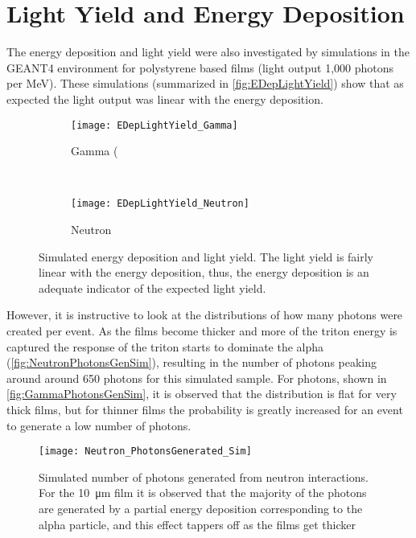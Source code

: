 \section{Light Yield and Energy Deposition}
The energy deposition and light yield were also investigated by simulations in the GEANT4 environment for polystyrene based films (light output 1,000 photons per MeV).
These simulations (summarized in \autoref{fig:EDepLightYield}) show that as expected the light output was linear with the energy deposition.
\begin{figure*}[ht]
	\centering
	\begin{subfigure}[b]{0.45\textwidth}
    		\texttt{[image: EDepLightYield\_Gamma]}
		\caption{ Gamma (}
	\end{subfigure}%
	~
	\begin{subfigure}[b]{0.45\textwidth}
    		\texttt{[image: EDepLightYield\_Neutron]}
		  \caption{ Neutron}
	\end{subfigure}%
  \caption[Energy Deposition and Light Yield]{Simulated energy deposition and light yield.  The light yield is fairly linear with the energy deposition, thus, the energy deposition is an adequate indicator of the expected light yield.}
  \label{fig:EDepLightYield}
\end{figure*}
However, it is instructive to look at the distributions of how many photons were created per event.
As the films become thicker and more of the triton energy is captured the response of the triton starts to dominate the alpha (\autoref{fig:NeutronPhotonsGenSim}), resulting in the number of photons peaking around around 650 photons for this simulated sample.
For photons, shown in \autoref{fig:GammaPhotonsGenSim}, it is observed that the distribution is flat for very thick films, but for thinner films the probability is greatly increased for an event to generate a low number of photons.
\begin{figure}
  \centering
  \texttt{[image: Neutron\_PhotonsGenerated\_Sim]}
  \caption[Number of photons generated from neutron interactions]{Simulated number of photons generated from neutron interactions.  For the \SI{10}{\um} film it is observed that the majority of the photons are generated by a partial energy deposition corresponding to the alpha particle, and this effect tappers off as the films get thicker}
  \label{fig:NeutronPhotonsGenSim}
\end{figure}
